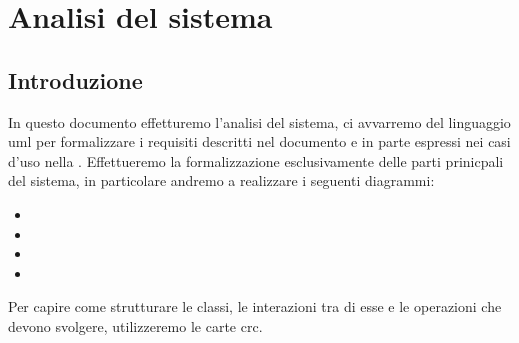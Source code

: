 \chapter{Analisi del sistema}\label{cha:analisi}

\section{Introduzione}
In questo documento effetturemo l'analisi del sistema, ci avvarremo del linguaggio \gls{uml} per formalizzare i requisiti descritti nel documento  e in parte espressi nei casi d'uso nella .
Effettueremo la formalizzazione esclusivamente delle parti prinicpali del sistema, in particolare andremo a realizzare i seguenti diagrammi:
\begin{itemize}
	\item {}
	\item {}
	\item {}
	\item {}
\end{itemize}
Per capire come strutturare le classi, le interazioni tra di esse e le operazioni che devono svolgere, utilizzeremo le carte \gls{crc}.

